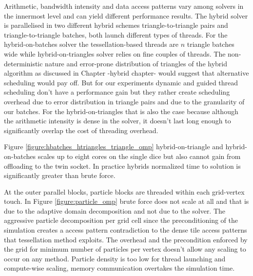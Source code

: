 Arithmetic, bandwidth intensity and data access patterns vary among solvers in the innermost level and can yield different performance results. The hybrid solver is parallelised in two different hybrid schemes triangle-to-triangle pairs and triangle-to-triangle batches, both launch different types of threads. For the hybrid-on-batches solver the tessellation-based threads
are $n$ triangle batches wide while hybrid-on-triangles solver relies on fine couples of threads. The non-deterministic nature and error-prone distribution of triangles of the hybrid algorithm as discussed in Chapter {-hybrid chapter-} would suggest that alternative scheduling would pay off. But for our experiments dynamic and guided thread scheduling don't have a performance gain but they rather create scheduling overhead due to error distribution in triangle pairs and due to the granularity of our batches. For the hybrid-on-triangles that is also the case because although the arithmetic intensity is dense in the solver, it doesn't last long enough to significantly overlap the cost of threading overhead. 

Figure \ref{figure:hbatches_htriangles_triangle_omp} hybrid-on-triangle and hybrid-on-batches scales up to eight cores on the single dice but also cannot gain from offloading to the twin socket. In practice hybrids normalized time to solution is significantly greater than brute force.




At the outer parallel blocks, particle blocks are threaded within each grid-vertex touch. In Figure \ref{figure:particle_omp} brute force does not scale at all and that is due to the adaptive domain decomposition and not due to the solver. The aggressive particle decomposition per grid cell since the preconditioning of the simulation creates a access pattern contradiction to the dense tile access patterns that tessellation method exploits. The overhead and the precondition enforced by the grid for minimum number of particles per vertex doesn't allow any scaling to occur on any method. Particle density is too low for thread launching and compute-wise scaling, memory communication overtakes the simulation time. 


